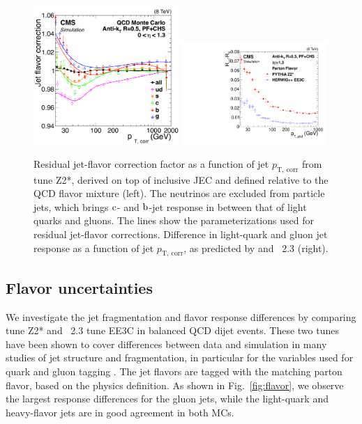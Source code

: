 \documentclass[11pt,twoside,a4paper,cmspaper,final,collab]{cms-tdr}
\begin{document}
\begin{figure}[htbp!]
\centering
\includegraphics[width=0.49\textwidth]{Figure_030-a.pdf}
\includegraphics[width=0.49\textwidth]{Figure_030-b.pdf}
\caption{\label{fig:flavorresponse}
Residual jet-flavor correction factor as a function of jet $p_\mathrm{T,~corr}$ from  tune Z2*, derived on top of inclusive JEC and defined relative to the QCD flavor mixture (left).
The neutrinos are excluded from particle jets, which brings $\mathrm{c}$- and $\mathrm{b}$-jet response in between that of light quarks and gluons. The lines show the parameterizations used for residual jet-flavor corrections.
Difference in light-quark and gluon jet response as a function of jet $p_\mathrm{T,~corr}$, as predicted by  and \HERWIGpp~2.3 (right).
}
\end{figure}

\subsection{Flavor uncertainties}
\label{sec:flavor}

We investigate the jet fragmentation and flavor response differences by comparing  tune Z2* and \HERWIGpp~2.3 tune EE3C in balanced QCD dijet events. These two tunes have been shown to cover differences between data and simulation in many studies of jet structure and fragmentation, in particular for the variables used for quark and gluon tagging \cite{CMS-PAS-JME-13-002}.
The jet flavors are tagged with the matching parton flavor, based on the physics definition.
As shown in Fig.~\ref{fig:flavor}, we observe the largest response differences for the gluon jets, while the light-quark and heavy-flavor jets are in good agreement in both MCs.
\end{document}
